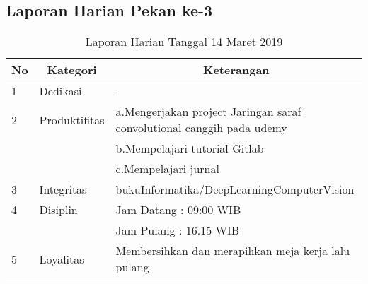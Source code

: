 \subsection{Laporan Harian Pekan ke-3}

\begin{table}[htp]
\caption{Laporan Harian Tanggal 14 Maret 2019}
\label{tab:lh140319}
\begin{tabular}{|l|l|l|}
\hline
\textbf{No} & \multicolumn{1}{c|}{\textbf{Kategori}} & \multicolumn{1}{c|}{\textbf{Keterangan}} \\ \hline
1 & Dedikasi & - \\ \hline
2 & Produktifitas & a.Mengerjakan project Jaringan saraf convolutional canggih pada udemy \\
   & & b.Mempelajari tutorial Gitlab \\ \hline
   & & c.Mempelajari jurnal \\ \hline
3 & Integritas & bukuInformatika/DeepLearningComputerVision \\ \hline
4 & Disiplin & Jam Datang : 09:00 WIB \\
   &  & Jam Pulang : 16.15 WIB \\ \hline
5 & Loyalitas & Membersihkan dan merapihkan meja kerja lalu pulang \\ \hline
\end{tabular}
\end{table}